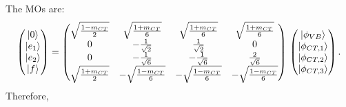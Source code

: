 \documentclass[journal=jpcafh]{achemso}
\begin{document}
The MOs are:\begin{equation}
	\begin{pmatrix}
		\ket{0} \\ \ket{e_1} \\ \ket{e_2} \\ \ket{f}
	\end{pmatrix} =
	\begin{pmatrix}
		\sqrt{\frac{1-m_{CT}}{2}}  & \sqrt{\frac{1+m_{CT}}{6}}  & \sqrt{\frac{1+m_{CT}}{6}}  & \sqrt{\frac{1+m_{CT}}{6}}\\
		0 & -\frac{1}{\sqrt{2}} & \frac{1}{\sqrt{2}} & 0\\
		0 & -\frac{1}{\sqrt{6}} &  -\frac{1}{\sqrt{6}} &  \frac{2}{\sqrt{6}} \\
		\sqrt{\frac{1+m_{CT}}{2}} & -\sqrt{\frac{1-m_{CT}}{6}}   & -\sqrt{\frac{1-m_{CT}}{6}}    & -\sqrt{\frac{1-m_{CT}}{6}} 
	\end{pmatrix} \,\begin{pmatrix}
		\ket{\phi_{VB}} \\ \ket{\phi_{CT,1}} \\ \ket{\phi_{CT,2}}\\ \ket{\phi_{CT,3}}
	\end{pmatrix}.
\end{equation}
Therefore,
\end{document}
